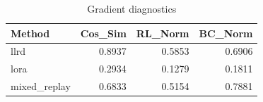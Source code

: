 \begin{table}[htbp]
\centering
\caption{Gradient diagnostics}
\label{tab:grad-diag}
\begin{tabular}{lrrr}
\toprule
\textbf{Method} & \textbf{Cos\_Sim} & \textbf{RL\_Norm} & \textbf{BC\_Norm} \\
\midrule
llrd & 0.8937 & 0.5853 & 0.6906 \\
lora & 0.2934 & 0.1279 & 0.1811 \\
mixed\_replay & 0.6833 & 0.5154 & 0.7881 \\
\bottomrule
\end{tabular}
\end{table}